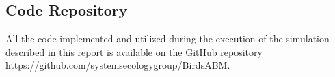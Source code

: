 %
%
%


\appendix
\begin{appendices}
    \section{Code Repository}
    \label{sec:code-repo}

    All the code implemented and utilized during the execution of the simulation described in this report is available on the GitHub repository \href{https://github.com/systemsecologygroup/BirdsABM}{https://github.com/systemsecologygroup/BirdsABM}.

\end{appendices}
